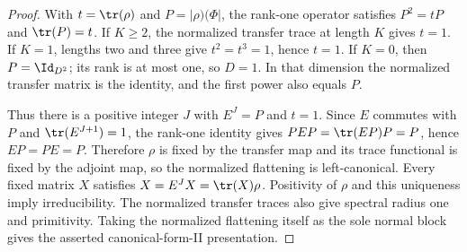 \begin{proof}\leanok
    With $t=\tr(\rho)$ and $P=\lvert\rho)(\Phi\rvert$, the rank-one operator satisfies
    $P^2=tP$ and $\tr(P)=t$. If $K\geq2$, the normalized transfer trace at
    length $K$ gives $t=1$. If $K=1$, lengths two and three give
    $t^2=t^3=1$, hence $t=1$. If $K=0$, then $P=\Id_{D^2}$; its rank is at
    most one, so $D=1$. In that dimension the normalized transfer matrix is
    the identity, and the first power also equals $P$.

    Thus there is a positive integer $J$ with $E^J=P$ and $t=1$. Since
    $E$ commutes with $P$ and $\tr(E^{J+1})=1$, the rank-one identity gives
    $PEP=\tr(EP)P=P$, hence $EP=PE=P$. Therefore $\rho$ is fixed by the
    transfer map and its trace functional is fixed by the adjoint map, so
    the normalized flattening is left-canonical. Every fixed matrix $X$
    satisfies $X=E^JX=\tr(X)\rho$. Positivity of $\rho$ and this uniqueness
    imply irreducibility. The normalized transfer traces also give spectral
    radius one and primitivity. Taking the normalized flattening itself as
    the sole normal block gives the asserted canonical-form-II presentation.
\end{proof}
